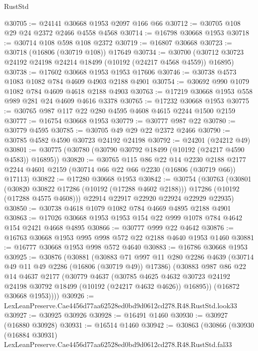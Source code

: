 \begin{lexlean}{RustStd}
\begin{coremodule}
@30705 := @24141 @30668 @1953 @2097 @166 @66
@30712 := @30705 @108 @29 @24 @2372 @2466 @4558 @4568
@30714 := @16798 @30668 @1953
@30718 := @30714 @108 @598 @108 @2372
@30719 := @16807 @30668
@30723 := @30718 (@16806 (@30719 @108)) @17649
@30734 := @30700 (@30712 @30723 @24192 @24198 @24214 @18499 (@10192 (@24217 @4568 @4559)) @16895)
@30738 := @17602 @30668 @1953 @1953 @17606
@30746 := @30738 @4573 @1083 @1082 @784 @4609 @4903 @2188 @4901
@30754 := @30692 @990 @1079 @1082 @784 @4609 @4618 @2188 @4903
@30763 := @17219 @30668 @1953 @558 @989 @281 @24 @4609 @4616 @3378
@30765 := @17232 @30668 @1953
@30775 := @30765 @987 @117 @22 @280 @4595 @4608 @4615 @2244 @1500 @2159
@30777 := @16754 @30668 @1953
@30779 := @30777 @987 @22
@30780 := @30779 @4595
@30785 := @30705 @49 @29 @22 @2372 @2466
@30790 := @30785 @4582 @4590 @30723 @24192 @24198
@30792 := @24201 (@24212 @49)
@30801 := @30775 (@30780 (@30790 @30792 @18499 (@10192 (@24217 @4590 @4583)) @16895))
@30820 := @30765
    @115
    @86
    @22
    @14
    @2230
    @2188
    @2177
    @2244
    @4601
    @2159
    (@30714 @66 @22 @66 @2230 (@16806 (@30719 @66)) @17113)
@30822 := @17280 @30668 @1953
@30842 := @30754
    (@30763
      (@30801
        (@30820 @30822 @17286 (@10192 (@17288 @4602 @2188)))
        @17286
        (@10192 (@17288 @4575 @4608)))
      @22914
      @22917
      @22920
      @22924
      @22929
      @22935)
@30850 := @30738 @4618 @1079 @1082 @784 @4669 @4895 @2188 @4901
@30863 := @17026 @30668 @1953 @1953 @154 @22 @999 @1078 @784 @4642 @154 @2421 @4668 @4895
@30866 := @30777 @999 @22 @4642
@30876 := @16763 @30668 @1953 @995 @998 @572 @22 @2188 @4640 @1953 @1460
@30881 := @16777 @30668 @1953 @998 @572 @4640
@30883 := @16786 @30668 @1953
@30925 := @30876
    (@30881
      (@30883
        @71
        @997
        @11
        @280
        @2286
        @4639
        (@30714 @49 @11 @49 @2286 (@16806 (@30719 @49)) @17386)
        (@30883
          @987
          @86
          @22
          @14
          @4637
          @2177
          (@30779
            @4637
            (@30785
              @4625
              @4632
              @30723
              @24192
              @24198
              @30792
              @18499
              (@10192 (@24217 @4632 @4626))
              @16895))
          (@16872 @30668 @1953))))
@30926 := LexLeanPreserve.Cae4456d77aa62528ed0bd9d0612cd278.R48.RustStd.look33
@30927 := @30925 @30926
@30928 := @16491 @1460
@30930 := @30927 (@16880 @30928)
@30931 := @16514 @1460
@30942 := @30863
    (@30866
      (@30930
        (@16884 @30931)
        LexLeanPreserve.Cae4456d77aa62528ed0bd9d0612cd278.R48.RustStd.fal33

\end{coremodule}
\end{lexlean}
